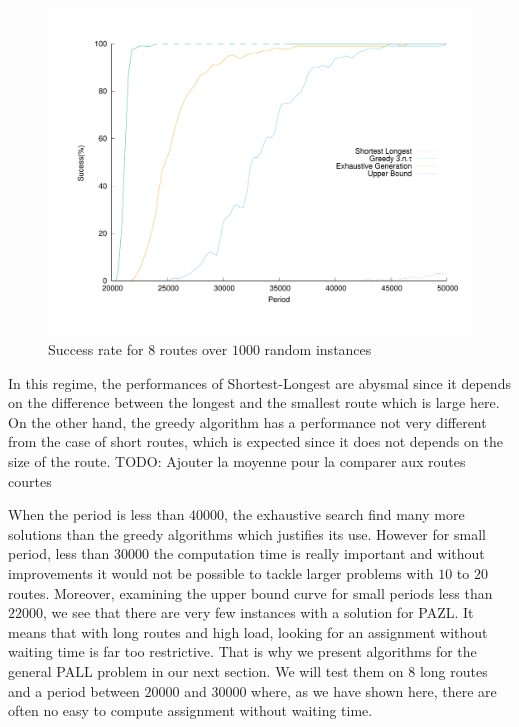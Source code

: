 \documentclass[a4paper,10pt]{article}
\newcommand{\todo}[1]{{\color{red} TODO: {#1}}}
\begin{document}
\begin{figure}

       \begin{center}
      \includegraphics[scale=0.4]{echec_longues.pdf}
      \end{center}
      \caption{Success rate for $8$ routes over $1000$ random instances}
     \end{figure}
      
      In this regime, the performances of Shortest-Longest are abysmal since it depends on the difference between the longest and the smallest route
      which is large here. On the other hand, the greedy algorithm has a performance not very different from the case of short routes, which is expected since it does not depends on the size of the route.  \todo{Ajouter la moyenne pour la comparer aux routes courtes}
      
      When the period is less than $40000$, the exhaustive search find many more solutions than the greedy algorithms which justifies its use. 
      However for small period, less than $30000$ the computation time is really important and without improvements it would not be possible to tackle 
      larger problems with $10$ to $20$ routes. Moreover, examining the upper bound curve for small periods less than $22000$, we see that there are very few instances with a solution for PAZL. It means that with long routes and high load, looking for an assignment without waiting time is far too restrictive.
      That is why we present algorithms for the general PALL problem in our next section. We will test them on $8$ long routes and a period between $20000$ and $30000$ where, as we have shown here, there are often no easy to compute assignment without waiting time.
      
\end{document}
